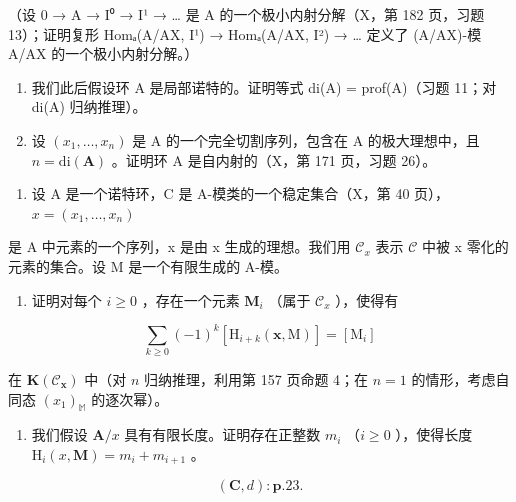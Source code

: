 （设 0 → A → I⁰ → I¹ → \ldots{} 是 A 的一个极小内射分解（X，第 182 页，习题 13）；证明复形 Homₐ(A/AX, I¹) → Homₐ(A/AX, I²) → \ldots{} 定义了 (A/AX)-模 A/AX 的一个极小内射分解。）

\begin{enumerate}
\def\labelenumi{\alph{enumi})}
\setcounter{enumi}{1}
\item
  我们此后假设环 A 是局部诺特的。证明等式 di(A) = prof(A)（习题 11；对 di(A) 归纳推理）。
\item
  设 \((x_{1},\ldots ,x_{n})\) 是 A 的一个完全切割序列，包含在 A 的极大理想中，且 \(n = \mathrm{di}(\mathbf{A})\) 。证明环 A 是自内射的（X，第 171 页，习题 26）。
\end{enumerate}

\begin{enumerate}
\def\labelenumi{\arabic{enumi})}
\setcounter{enumi}{17}
\tightlist
\item
  设 A 是一个诺特环，C 是 A-模类的一个稳定集合（X，第 40 页）， \(x = (x_{1}, \ldots, x_{n})\)
\end{enumerate}

是 A 中元素的一个序列，x 是由 x 生成的理想。我们用 \(\mathcal{C}_{x}\) 表示 \(\mathcal{C}\) 中被 x 零化的元素的集合。设 M 是一个有限生成的 A-模。

\begin{enumerate}
\def\labelenumi{\alph{enumi})}
\tightlist
\item
  证明对每个 \(i \geqslant 0\) ，存在一个元素 \(\mathbf{M}_{i}\) （属于 \(\mathcal{C}_{x}\) ），使得有
\end{enumerate}

\[
\sum_ {k \geqslant 0} (- 1) ^ {k} \left[ \mathrm{H} _ {i + k} (\mathbf {x}, \mathrm{M}) \right] = [ \mathrm{M} _ {i} ]
\]

在 \(\mathbf{K}(\mathcal{C}_{\pmb{x}})\) 中（对 \(n\) 归纳推理，利用第 157 页命题 4；在 \(n = 1\) 的情形，考虑自同态 \((x_{1})_{\mathbb{M}}\) 的逐次幂）。

\begin{enumerate}
\def\labelenumi{\alph{enumi})}
\setcounter{enumi}{1}
\tightlist
\item
  我们假设 \(\mathbf{A} / x\) 具有有限长度。证明存在正整数 \(m_{i}\) （\(i \geqslant 0\) ），使得长度 \(\mathrm{H}_{i}(x, \mathbf{M}) = m_{i} + m_{i+1}\) 。
\end{enumerate}


\[
(\mathbf {C}, d): \mathbf {p}. 2 3.
\]

